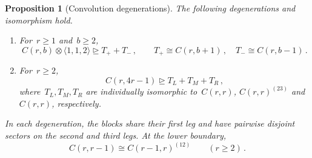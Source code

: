 \documentclass[11pt,letterpaper]{article}
\newtheorem{proposition}[theorem]{Proposition}
\theoremstyle{definition}
\numberwithin{equation}{section}
\newcommand{\degen}{\unrhd}
\begin{document}
\begin{proposition}[Convolution degenerations]\label{prop:convolution}
The following degenerations and isomorphism hold.
\begin{enumerate}
\item For~$r\geq1$ and~$b\geq2$,
\begin{equation}\label{eq:neighbor-degeneration}
 C(r,b)\otimes \langle1,1,2\rangle\degen T_++T_-\,,\qquad
 T_+\cong C(r,b+1)\,,\quad T_-\cong C(r,b-1)\,.
\end{equation}
\item For~$r\geq2$,
\begin{equation}\label{eq:tripling-degeneration}
 C(r,4r-1)\degen T_L+T_M+T_R\,,
\end{equation}
where~$T_L,T_M,T_R$ are individually isomorphic to~$C(r,r)$, $C(r,r)^{(23)}$ and~$C(r,r)$, respectively.
\end{enumerate}
In each degeneration, the blocks share their first leg and have pairwise disjoint sectors on the second and third legs. At the lower boundary,
\begin{equation}\label{eq:boundary-isomorphism}
 C(r,r-1)\cong C(r-1,r)^{(12)}\qquad(r\geq2)\,.
\end{equation}
\end{proposition}
\end{document}

